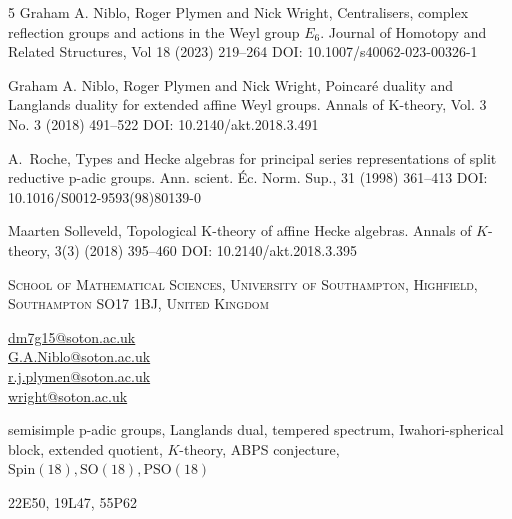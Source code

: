 \documentclass[11pt,a4paper]{article}
\def\Spin{\mathrm{Spin}}
\def\SO{\mathrm{SO}}
\def\PSO{\mathrm{PSO}}
\begin{document}
\begin{thebibliography}{5}
 Graham A. Niblo, Roger Plymen and Nick Wright, Centralisers, complex reflection groups and actions in the Weyl group $E_6$. Journal of Homotopy and Related Structures, Vol 18 (2023) 219--264 DOI: 10.1007/s40062-023-00326-1

 Graham A. Niblo, Roger Plymen and Nick Wright, Poincaré duality and Langlands duality for extended affine Weyl groups. Annals of K-theory, Vol. 3  No. 3 (2018) 491--522 DOI: 10.2140/akt.2018.3.491

 A.~Roche, Types and Hecke algebras for principal series representations of split
reductive p-adic groups. Ann. scient. Éc. Norm. Sup., 31 (1998) 361--413 DOI: 10.1016/S0012-9593(98)80139-0

 Maarten Solleveld, Topological K-theory of affine Hecke algebras. Annals of $K$-theory, 3(3) (2018) 395--460
DOI: 10.2140/akt.2018.3.395


\end{thebibliography}

\bigskip

\noindent\textsc{School of Mathematical Sciences, University of Southampton, Highfield, Southampton SO17 1BJ, United Kingdom}

\smallskip
\noindent\url{dm7g15@soton.ac.uk}\\
\url{G.A.Niblo@soton.ac.uk}\\
\url{r.j.plymen@soton.ac.uk}\\
\url{wright@soton.ac.uk}

\vskip 1in


 semisimple p-adic groups, Langlands dual, tempered spectrum, Iwahori-spherical block, extended quotient, $K$-theory, ABPS conjecture, $\Spin(18), \SO(18), \PSO(18)$

\medskip

 22E50, 19L47, 55P62
\end{document}
